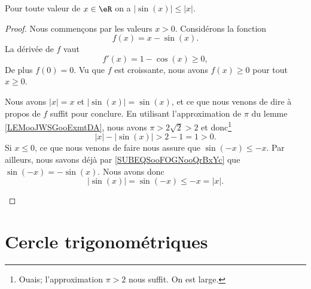 	\begin{lemma}       \label{LEMooIECUooQOGYyN}
		Pour toute valeur de \( x\in \eR\) on a \( |\sin(x)|\leq |x|\).
	\end{lemma}

	\begin{proof}
		Nous commençons par les valeurs \( x>0\). Considérons la fonction
		\begin{equation}
			f(x)=x-\sin(x).
		\end{equation}
		La dérivée de \( f\) vaut
		\begin{equation}
			f'(x)=1-\cos(x)\geq 0,
		\end{equation}
		De plus \( f(0)=0\). Vu que \( f\) est croissante, nous avons \( f(x)\geq 0\) pour tout \( x\geq 0\).

		\begin{subproof}
			Nous avons \(| x |=x\) et \( | \sin(x) |=\sin(x)\), et ce que nous venons de dire à propos de \( f\) suffit pour conclure.
			En utilisant l'approximation de \( \pi\) du lemme \ref{LEMooJWSGooExmtDA}, nous avons \( \pi>2\sqrt{ 2 }>2\) et donc\footnote{Ouais; l'approximation \( \pi>2\) nous suffit. On est large.}
			\begin{equation}
				| x |-| \sin(x) |>2-1=1>0.
			\end{equation}
			\spitem[Pour \( x<0\)]
			Si \( x\leq 0\), ce que nous venons de faire nous assure que \( \sin(-x)\leq -x\). Par ailleurs, nous savons déjà par \eqref{SUBEQSooFOGNooQrBxYc} que \( \sin(-x)=-\sin(x)\). Nous avons donc
			\begin{equation}
				| \sin(x) |=\sin(-x)\leq -x=| x |.
			\end{equation}
		\end{subproof}
	\end{proof}

	\section{Cercle trigonométriques}

